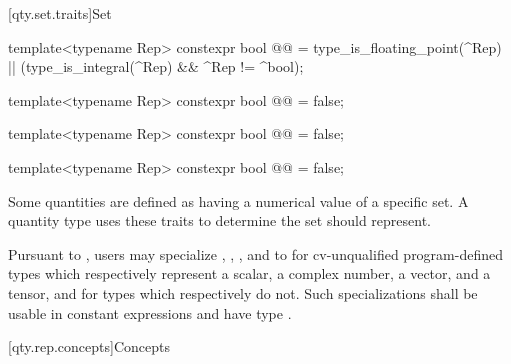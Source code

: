 [qty.set.traits]{Set}

\begin{itemdecl}
template<typename Rep>
constexpr bool @@ =
  type_is_floating_point(^Rep) || (type_is_integral(^Rep) && ^Rep != ^bool);

template<typename Rep>
constexpr bool @@ = false;

template<typename Rep>
constexpr bool @@ = false;

template<typename Rep>
constexpr bool @@ = false;
\end{itemdecl}

\begin{itemdescr}
\pnum
Some quantities are defined as having a numerical value of a specific set.
A quantity type  uses these traits
to determine the set  should represent.

\pnum
\remarks
Pursuant to ,
users may specialize , , , and  to 
for cv-unqualified program-defined types
which respectively represent
a scalar,
a complex number,
a vector, and
a tensor,
and  for types which respectively do not.
Such specializations shall be usable in constant expressions
and have type .
\end{itemdescr}

[qty.rep.concepts]{Concepts}

